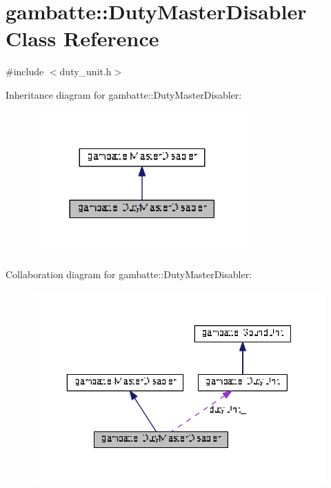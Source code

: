\hypertarget{classgambatte_1_1DutyMasterDisabler}{}\section{gambatte\+:\+:Duty\+Master\+Disabler Class Reference}
\label{classgambatte_1_1DutyMasterDisabler}


{\ttfamily \#include $<$duty\+\_\+unit.\+h$>$}



Inheritance diagram for gambatte\+:\+:Duty\+Master\+Disabler\+:\nopagebreak
\begin{figure}[H]
\begin{center}
\leavevmode
\includegraphics[width=237pt]{classgambatte_1_1DutyMasterDisabler__inherit__graph}
\end{center}
\end{figure}


Collaboration diagram for gambatte\+:\+:Duty\+Master\+Disabler\+:
\nopagebreak
\begin{figure}[H]
\begin{center}
\leavevmode
\includegraphics[width=343pt]{classgambatte_1_1DutyMasterDisabler__coll__graph}
\end{center}
\end{figure}
